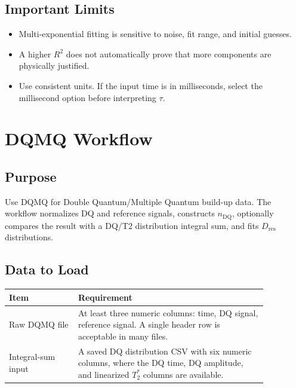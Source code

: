 \documentclass[11pt,a4paper]{article}
\newcommand{\TtwoStar}{\ensuremath{T_2^{\ast}}}
\newcommand{\Dres}{\ensuremath{D_{\mathrm{res}}}}
\newcommand{\nDQ}{\ensuremath{n_{\mathrm{DQ}}}}
\begin{document}
\subsection{Important Limits}
\begin{itemize}
  \item Multi-exponential fitting is sensitive to noise, fit range, and initial guesses.
  \item A higher \(R^2\) does not automatically prove that more components are physically justified.
  \item Use consistent units. If the input time is in milliseconds, select the millisecond option before interpreting \(\tau\).
\end{itemize}

\section{DQMQ Workflow}

\subsection{Purpose}
Use DQMQ for Double Quantum/Multiple Quantum build-up data. The workflow normalizes DQ and reference signals, constructs \nDQ{}, optionally compares the result with a DQ/T2 distribution integral sum, and fits \Dres{} distributions.

\subsection{Data to Load}
\begin{longtable}{p{0.23\linewidth}p{0.63\linewidth}}
\toprule
Item & Requirement \\
\midrule
Raw DQMQ file & At least three numeric columns: time, DQ signal, reference signal. A single header row is acceptable in many files. \\
Integral-sum input & A saved DQ distribution CSV with six numeric columns, where the DQ time, DQ amplitude, and linearized \TtwoStar{} columns are available. \\
\bottomrule
\end{longtable}
\end{document}
